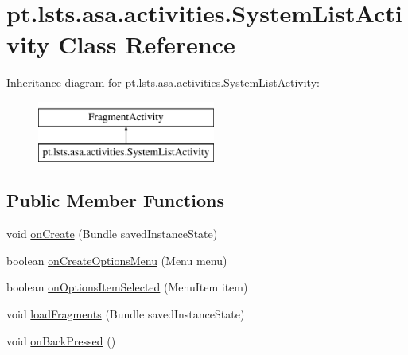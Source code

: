 \hypertarget{classpt_1_1lsts_1_1asa_1_1activities_1_1SystemListActivity}{}\section{pt.\+lsts.\+asa.\+activities.\+System\+List\+Activity Class Reference}
\label{classpt_1_1lsts_1_1asa_1_1activities_1_1SystemListActivity}
Inheritance diagram for pt.\+lsts.\+asa.\+activities.\+System\+List\+Activity\+:\begin{figure}[H]
\begin{center}
\leavevmode
\includegraphics[height=2.000000cm]{classpt_1_1lsts_1_1asa_1_1activities_1_1SystemListActivity}
\end{center}
\end{figure}
\subsection*{Public Member Functions}
\begin{DoxyCompactItemize}
\item 
void \hyperlink{classpt_1_1lsts_1_1asa_1_1activities_1_1SystemListActivity_aae2288293590b40f86db0462e12415ce}{on\+Create} (Bundle saved\+Instance\+State)
\item 
boolean \hyperlink{classpt_1_1lsts_1_1asa_1_1activities_1_1SystemListActivity_a00cc7bfe4397f281d8f4143340eb0108}{on\+Create\+Options\+Menu} (Menu menu)
\item 
boolean \hyperlink{classpt_1_1lsts_1_1asa_1_1activities_1_1SystemListActivity_a4a169cb51fbfdc7650727cf806aa03e9}{on\+Options\+Item\+Selected} (Menu\+Item item)
\item 
void \hyperlink{classpt_1_1lsts_1_1asa_1_1activities_1_1SystemListActivity_af02c115fc6f8e8be5e9e3ccd12234838}{load\+Fragments} (Bundle saved\+Instance\+State)
\item 
void \hyperlink{classpt_1_1lsts_1_1asa_1_1activities_1_1SystemListActivity_acc9f5cdb9a9a350ec870ff72b5c173e0}{on\+Back\+Pressed} ()
\end{DoxyCompactItemize}
